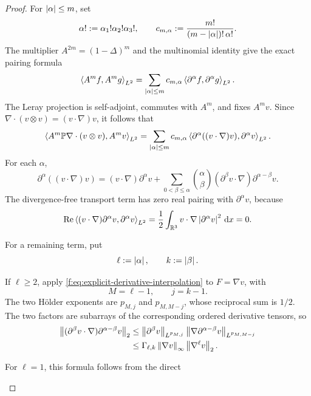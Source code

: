 \begin{proof}
For \(\left|\alpha\right|\le m\), set
\[
 \alpha!:=\alpha_1!\alpha_2!\alpha_3!,
 \qquad
 c_{m,\alpha}:=\frac{m!}{(m-\left|\alpha\right|)!\,\alpha!}.
\]
The multiplier \(A^{2m}=(1-\Delta)^m\) and the multinomial identity give the
exact pairing formula
\begin{equation}
 \left\langle A^mf,A^mg\right\rangle_{L^2}
 =\sum_{\left|\alpha\right|\le m}c_{m,\alpha}
   \left\langle \partial^\alpha f,\partial^\alpha g\right\rangle_{L^2}.
 \label{f:eq:integer-Am-pairing}
\end{equation}
The Leray projection is self-adjoint, commutes with \(A^m\), and fixes
\(A^mv\).  Since
\(\nabla\cdot(v\otimes v)=(v\cdot\nabla)v\), it follows that
\begin{equation}
 \left\langle A^m\mathbb P\nabla\cdot(v\otimes v),A^mv\right\rangle_{L^2}
 =\sum_{\left|\alpha\right|\le m}c_{m,\alpha}
   \left\langle \partial^\alpha((v\cdot\nabla)v),\partial^\alpha v\right\rangle_{L^2}.
 \label{f:eq:integer-projected-pairing}
\end{equation}
For each \(\alpha\),
\[
 \partial^\alpha((v\cdot\nabla)v)
 =(v\cdot\nabla)\partial^\alpha v
 +\sum_{0<\beta\le\alpha}\binom\alpha\beta
 (\partial^\beta v\cdot\nabla)
 \partial^{\alpha-\beta}v.
\]
The divergence-free transport term has zero real pairing with
\(\partial^\alpha v\), because
\[
 \operatorname{Re}\left\langle (v\cdot\nabla)\partial^\alpha v,\partial^\alpha v\right\rangle_{L^2}
 =\frac12\int_{\mathbb R^3}v\cdot\nabla
   \left|\partial^\alpha v\right|^2\,\mathrm d x=0.
\]
\begin{samepage}
For a remaining term, put
\[
 \ell:=\left|\alpha\right|,
 \qquad k:=\left|\beta\right|.
\]
\par
\end{samepage}
\begin{samepage}
If \(\ell\ge2\), apply
\eqref{f:eq:explicit-derivative-interpolation} to \(F=\nabla v\), with
\[
 M=\ell-1,
 \qquad j=k-1.
\]
The two H\"older exponents are \(p_{M,j}\) and \(p_{M,M-j}\), whose
reciprocal sum is \(1/2\).  The two factors are subarrays of the corresponding
ordered derivative tensors, so
\begin{align}
 \left\lVert (\partial^\beta v\cdot\nabla)
          \partial^{\alpha-\beta}v\right\rVert_2
 &\le
 \left\lVert \partial^\beta v\right\rVert_{L^{p_{M,j}}}
 \left\lVert \nabla\partial^{\alpha-\beta}v\right\rVert_{L^{p_{M,M-j}}}\notag\\
 &\le\Gamma_{\ell,k}\left\lVert \nabla v\right\rVert_\infty
       \left\lVert \nabla^\ell v\right\rVert_2.
 \label{f:eq:explicit-commutator-product}
\end{align}
\par
\end{samepage}
\begin{samepage}
For \(\ell=1\), this formula follows from the direct

\end{samepage}
\end{proof}
